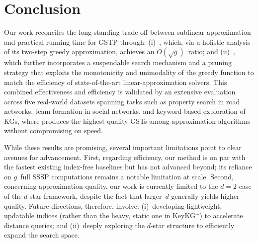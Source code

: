 \section{Conclusion}
\label{sec: conclusion}

Our work reconciles the long-standing trade-off between sublinear approximation and practical running time for GSTP through: (i)~\BasicPTS, which, via a holistic analysis of its two-step greedy approximation, achieves an $O(\sqrt{g})$~ratio; and (ii)~\ImprovPTS, which further incorporates a suspendable search mechanism and a pruning strategy that exploits the monotonicity and unimodality of the greedy function to match the efficiency of state-of-the-art linear-approximation solvers. This combined effectiveness and efficiency is validated by an extensive evaluation across five real-world datasets spanning tasks such as property search in road networks, team formation in social networks, and keyword-based exploration of KGs, where \ImprovPTS produces the highest-quality GSTs among approximation algorithms without compromising on speed.

While these results are promising, several important limitations point to clear avenues for advancement. First, regarding efficiency, our method is on par with the fastest existing index-free baselines but has not advanced beyond; its reliance on $g$~full SSSP computations remains a notable limitation at scale. Second, concerning approximation quality, our work is currently limited to the $d=2$ case of the $d$-star framework, despite the fact that larger~$d$ generally yields higher quality. Future directions, therefore, involve: (i)~developing lightweight, updatable indices (rather than the heavy, static one in KeyKG$^+$) to accelerate distance queries; and (ii)~deeply exploring the $d$-star structure to efficiently expand the search space.

